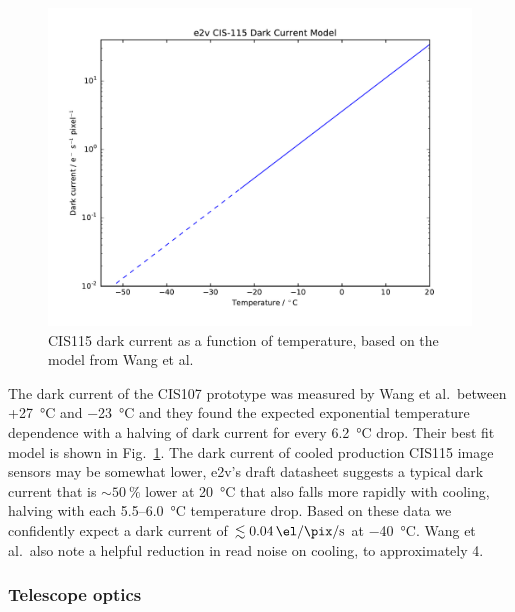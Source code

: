 \documentclass[]{iac}
\begin{document}
\begin{figure}[tp]
  \center \includegraphics[width=\columnwidth]{figures/CIS115DC.pdf}
  \caption{\label{fig:dc}CIS115 dark current as a function of temperature, based on the model from Wang et al.
    \cite{Wang2014}}
\end{figure}

The dark current of the CIS107 prototype was measured by Wang et al.\ between +\SI{27}{\celsius} and \SI{-23}{\celsius}
and they found the expected exponential temperature dependence with a halving of dark current for every
\SI{6.2}{\celsius} drop. Their best fit model is shown in Fig.~\ref{fig:dc}. The dark current of cooled production
CIS115 image sensors may be somewhat lower, e2v's draft datasheet suggests a typical dark current that is
$\sim\SI{50}{\percent}$ lower at \SI{20}{\celsius} that also falls more rapidly with cooling, halving with each
5.5--\SI{6.0}{\celsius} temperature drop. Based on these data we confidently expect a dark current of
$\lesssim\SI{0.04}{\el\per\pix\per\second}$ at \SI{-40}{\celsius}. Wang et al.\ also note a helpful reduction in read
noise on cooling, to approximately \SI{4}{\el}.

\subsubsection{Telescope optics}
\end{document}

